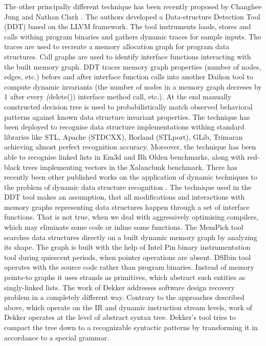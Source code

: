 \quad The other principally different technique has been recently proposed by Changhee Jung and Nathan Clark \cite{1669122}. The authors developed a Data-structure Detection Tool (DDT) based on the LLVM framework. The tool instruments loads, stores and calls withing program binaries and gathers dynamic traces for sample inputs. The traces are used to recreate a memory allocation graph for program data structures. Call graphs are used to identify interface functions interacting with the built memory graph. DDT traces memory graph properties (number of nodes, edges, etc.) before and after interface function calls into another Daikon tool to compute dynamic invariants (the number of nodes in a memory graph decreses by 1 after every \textit(delete()) interface method call, etc.). At the end manually constructed decision tree is used to probabilistically match observed behavioral patterns against known data structure invariant properties. The technique has been deployed to recognise data structure implementations withing standard libraries like STL, Apache (STDCXX), Borland (STLport), GLib, Trimaran achieving almost perfect recognition accuracy. Moreover, the technique has been able to recognise linked lists in Em3d and Bh Olden benchmarks, along with red-black trees implementing vectors in the Xalancbmk benchmark.\newline\null
\quad There has recently been other published works on the application of dynamic techniques to the problem of dynamic data structure recognition \cite{Rupprecht:2017:DID:3155562.3155607}\cite{Haller:2016:SDS:2938006.2938029}. The technique used in the DDT tool \cite{1669122} makes an assumption, that all modifications and interactions with memory graphs representing data structures happen through a set of interface functions. That is not true, when we deal with aggressively optimising compilers, which may eliminate some code or inline some functions. The MemPick tool \cite{Haller:2016:SDS:2938006.2938029} searches data structures directly on a built dynamic memory graph by analyzing its shape. The graph is built with the help of Intel Pin binary instrumentation tool during quiescent periods, when pointer operations are absent. DSIbin tool \cite{Rupprecht:2017:DID:3155562.3155607} operates with the source code rather than program binaries. Instead of memory points-to graphs it uses strands as primitives, which abstract such entities as singly-linked lists.\newline\null
\quad The work of Dekker \cite{Dekker:1994:ADS:3107859.3107876} addresses software design recovery problem in a completely different way. Contrary to the approaches described above, which operate on the IR and dynamic instruction stream levels, work of Dekker operates at the level of abstract syntax tree. Dekker's tool tries to compact the tree down to a recognizable syntactic patterns by transforming it in accordance to a special grammar.

